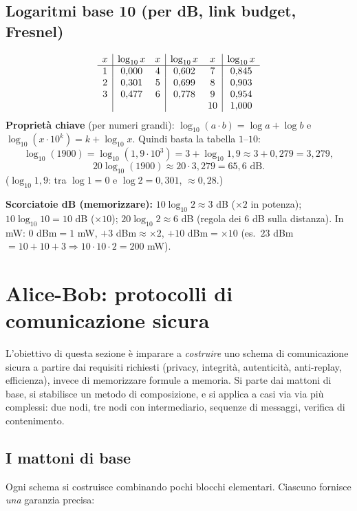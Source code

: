 \documentclass[11pt,a4paper]{report}
\begin{document}
\subsection*{Logaritmi base 10 (per dB, link budget, Fresnel)}
\[
\begin{array}{c|c @{\quad} c|c @{\quad} c|c}
x & \log_{10}x & x & \log_{10}x & x & \log_{10}x \\ \hline
1 & 0{,}000 & 4 & 0{,}602 & 7 & 0{,}845 \\
2 & 0{,}301 & 5 & 0{,}699 & 8 & 0{,}903 \\
3 & 0{,}477 & 6 & 0{,}778 & 9 & 0{,}954 \\
  &        &   &        & 10 & 1{,}000 \\
\end{array}
\]
\textbf{Proprietà chiave} (per numeri grandi): $\log_{10}(a\cdot b)=\log a+\log b$
e $\log_{10}(x\cdot 10^k)=k+\log_{10}x$. Quindi basta la tabella $1$--$10$:
\[
\log_{10}(1900)=\log_{10}(1{,}9\cdot10^3)=3+\log_{10}1{,}9\approx 3+0{,}279=3{,}279,
\]
\[
20\log_{10}(1900)\approx 20\cdot3{,}279=65{,}6\text{ dB}.
\]
($\log_{10}1{,}9$: tra $\log 1=0$ e $\log 2=0{,}301$, $\approx 0{,}28$.)

\textbf{Scorciatoie dB (memorizzare):} $10\log_{10}2\approx 3$ dB
($\times2$ in potenza); $10\log_{10}10=10$ dB ($\times10$);
$20\log_{10}2\approx 6$ dB (regola dei 6 dB sulla distanza). In mW:
$0$ dBm$=1$ mW, $+3$ dBm$\approx\times2$, $+10$ dBm$=\times10$
(es.\ $23$ dBm$=10\!+\!10\!+\!3\Rightarrow 10\cdot10\cdot2=200$ mW).

\section{Alice-Bob: protocolli di comunicazione sicura}
\label{teoria:alicebob}

L'obiettivo di questa sezione è imparare a \emph{costruire} uno schema di
comunicazione sicura a partire dai requisiti richiesti (privacy, integrità,
autenticità, anti-replay, efficienza), invece di memorizzare formule a memoria.
Si parte dai mattoni di base, si stabilisce un metodo di composizione, e si
applica a casi via via più complessi: due nodi, tre nodi con intermediario,
sequenze di messaggi, verifica di contenimento.

\subsection{I mattoni di base}

Ogni schema si costruisce combinando pochi blocchi elementari. Ciascuno fornisce
\emph{una} garanzia precisa:
\end{document}
